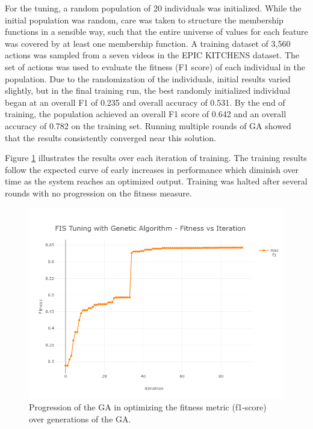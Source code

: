\documentclass[12pt]{report}
\begin{document}
For the tuning, a random population of 20 individuals was initialized. While the initial population was random, care was taken to structure the membership functions in a sensible way, such that the entire universe of values for each feature was covered by at least one membership function. A training dataset of 3,560 actions was sampled from a seven videos in the EPIC KITCHENS dataset. The set of actions was used to evaluate the fitness (F1 score) of each individual in the population. Due to the randomization of the individuals, initial results varied slightly, but in the final training run, the best randomly initialized individual began at an overall F1 of 0.235 and overall accuracy of 0.531. By the end of training, the population achieved an overall F1 score of 0.642 and an overall accuracy of 0.782 on the training set. Running multiple rounds of GA showed that the results consistently converged near this solution. 

Figure \ref{ga_training} illustrates the results over each iteration of training. The training results follow the expected curve of early increases in performance which diminish over time as the system reaches an optimized output. Training was halted after several rounds with no progression on the fitness measure.

\begin{figure}[t]
\centerline{\includegraphics[width=.95\textwidth]{figure/ga_plot.png}}
\caption{Progression of the GA in optimizing the fitness metric (f1-score) over generations of the GA.}
\label{ga_training}
\end{figure}
\end{document}
